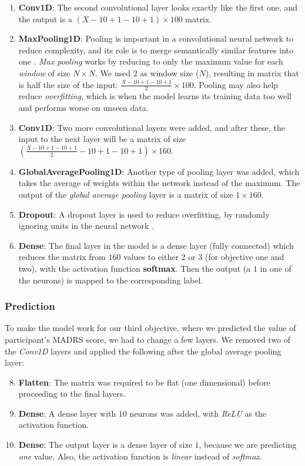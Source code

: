 \begin{enumerate}
      \item \textbf{Conv1D}: The second convolutional layer looks exactly like the first one, and the output is a $(X-10+1-10+1) \times 100$ matrix. 
      \item \textbf{MaxPooling1D}: Pooling is important in a convolutional neural network to reduce complexity, and its role is to merge semantically similar features into one \cite{deep_learning}. 
            \textit{Max pooling} works by reducing to only the maximum value for each \textit{window} of size $N \times N$. We used 2 as 
            window size ($N$), resulting in matrix that is half the size of the input: $ \frac{X-10+1-10+1}{2} \times 100$. 
            Pooling may also help reduce \textit{overfitting}, which is when the model learns its training data too well and performs worse on unseen data.
      \item \textbf{Conv1D}: Two more convolutional layers were added, and after these, the input to the next layer will be a matrix of size
            $ \left( \frac{X-10+1-10+1}{2}-10+1-10+1 \right) \times 160 $.
      \item \textbf{GlobalAveragePooling1D}: Another type of pooling layer was added, which takes the average of weights within the network instead of the maximum.
            The output of the \textit{global average pooling} layer is a matrix of size $ 1 \times 160 $.
      \item \textbf{Dropout}: A dropout layer is used to reduce overfitting, by randomly ignoring units in the neural network \cite{dropout}. 
      \item \textbf{Dense}: The final layer in the model is a dense layer (fully connected) which reduces the matrix from $160$ values to 
            either $2$ or $3$ (for objective one and two), with the activation function \textbf{softmax}. 
            Then the output (a $1$ in one of the neurons) is mapped to the corresponding label.
\end{enumerate}

\subsubsection{Prediction}
To make the model work for our third objective, where we predicted the value of participant's MADRS score, we had to change a few layers. We removed two of the \textit{Conv1D} layers and applied the following after the global average pooling layer:

\begin{enumerate}
      \setcounter{enumi}{7}
      \item \textbf{Flatten}: The matrix was required to be flat (one dimensional) before proceeding to the final layers.
      \item \textbf{Dense}: A dense layer with $10$ neurons was added, with \textit{ReLU} as the activation function. 
      \item \textbf{Dense}: The output layer is a dense layer of size $1$, because we are predicting \textit{one} value. 
            Also, the activation function is \textit{linear} instead of \textit{softmax}.
\end{enumerate}

